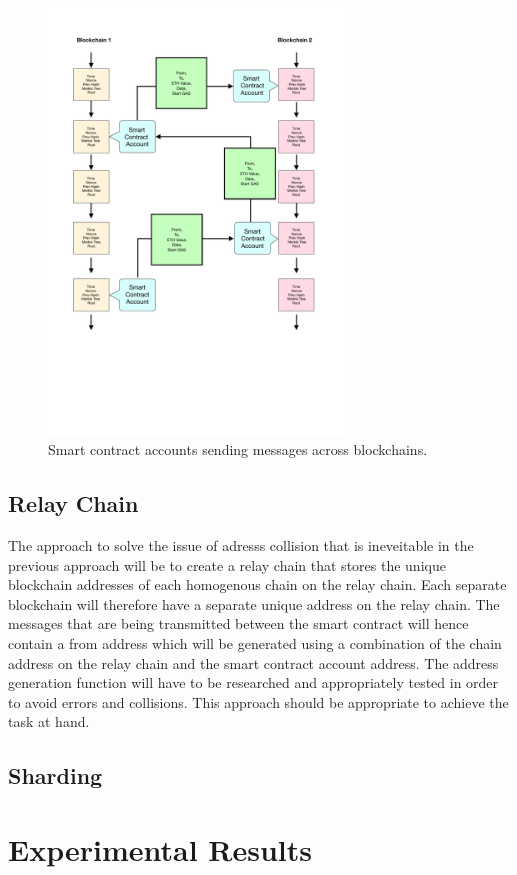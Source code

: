 \documentclass[a4paper,twoside,phd]{BYUPhys}
\begin{document}
\begin{figure}[t]
\centering
\includegraphics[width=8cm]{cap1}
\caption{Smart contract accounts sending messages across blockchains.}
\label{fig:cap1}
\end{figure}

\section{Relay Chain}
The approach to solve the issue of adresss collision that is ineveitable in the previous approach will be to create a relay chain that stores the unique blockchain addresses of each homogenous chain on the relay chain. Each separate blockchain will therefore have a separate unique address on the relay chain. The messages that are being transmitted between the smart contract will hence contain a from address which will be generated using a combination of the chain address on the relay chain and the smart contract account address. The address generation function will have to be researched and appropriately tested in order to avoid errors and collisions. This approach should be appropriate to achieve the task at hand.
\section{Sharding}
\label{sec:ConclusionsConclusions}

\clearemptydoublepage
\chapter{Experimental Results}
\end{document}
